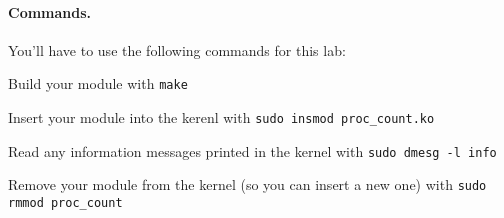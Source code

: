 \paragraph{Commands.}

You'll have to use the following commands for this lab:

Build your module with \lstinline|make|

Insert your module into the kerenl with \lstinline|sudo insmod proc_count.ko|

Read any information messages printed in the kernel with
\lstinline|sudo dmesg -l info|

Remove your module from the kernel (so you can insert a new one) with
\lstinline|sudo rmmod proc_count|



